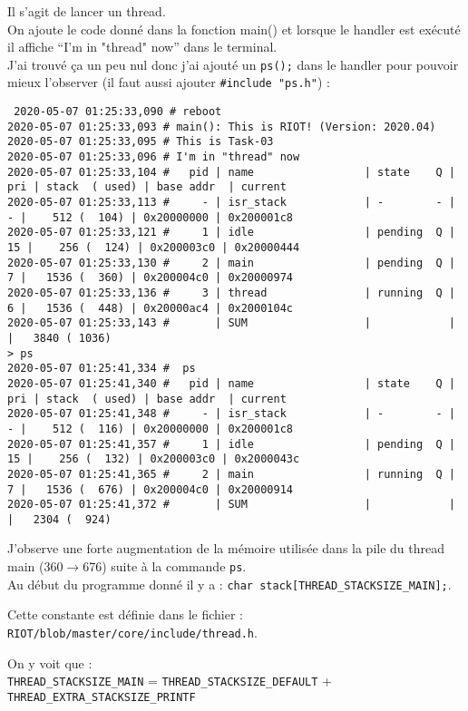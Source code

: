 Il s'agit de lancer un thread.\\

On ajoute le code donné dans la fonction main() et lorsque le handler
est exécuté il affiche \enquote{I'm in "thread" now} dans le terminal.\\

J'ai trouvé ça un peu nul donc j'ai ajouté un \texttt{ps();} dans le
handler pour pouvoir mieux l'observer (il faut aussi ajouter
\texttt{\#include "ps.h"}) :
{\scriptsize
\begin{verbatim}
 2020-05-07 01:25:33,090 # reboot
2020-05-07 01:25:33,093 # main(): This is RIOT! (Version: 2020.04)
2020-05-07 01:25:33,095 # This is Task-03
2020-05-07 01:25:33,096 # I'm in "thread" now
2020-05-07 01:25:33,104 # 	pid | name                 | state    Q | pri | stack  ( used) | base addr  | current     
2020-05-07 01:25:33,113 # 	  - | isr_stack            | -        - |   - |    512 (  104) | 0x20000000 | 0x200001c8
2020-05-07 01:25:33,121 # 	  1 | idle                 | pending  Q |  15 |    256 (  124) | 0x200003c0 | 0x20000444 
2020-05-07 01:25:33,130 # 	  2 | main                 | pending  Q |   7 |   1536 (  360) | 0x200004c0 | 0x20000974 
2020-05-07 01:25:33,136 # 	  3 | thread               | running  Q |   6 |   1536 (  448) | 0x20000ac4 | 0x2000104c 
2020-05-07 01:25:33,143 # 	    | SUM                  |            |     |   3840 ( 1036)
> ps
2020-05-07 01:25:41,334 #  ps
2020-05-07 01:25:41,340 # 	pid | name                 | state    Q | pri | stack  ( used) | base addr  | current     
2020-05-07 01:25:41,348 # 	  - | isr_stack            | -        - |   - |    512 (  116) | 0x20000000 | 0x200001c8
2020-05-07 01:25:41,357 # 	  1 | idle                 | pending  Q |  15 |    256 (  132) | 0x200003c0 | 0x2000043c 
2020-05-07 01:25:41,365 # 	  2 | main                 | running  Q |   7 |   1536 (  676) | 0x200004c0 | 0x20000914 
2020-05-07 01:25:41,372 # 	    | SUM                  |            |     |   2304 (  924)
\end{verbatim}
}
J'observe une forte augmentation de la mémoire utilisée dans la pile du
thread main (360$\rightarrow$676) suite à la commande \texttt{ps}.\\

Au début du programme donné il y a :
\texttt{char stack[THREAD\_STACKSIZE\_MAIN];}.

Cette constante est définie dans le fichier :
\texttt{RIOT/blob/master/core/include/thread.h}.

On y voit que :\\
\texttt{THREAD\_STACKSIZE\_MAIN} =
\texttt{THREAD\_STACKSIZE\_DEFAULT} +
\texttt{THREAD\_EXTRA\_STACKSIZE\_PRINTF}\\

